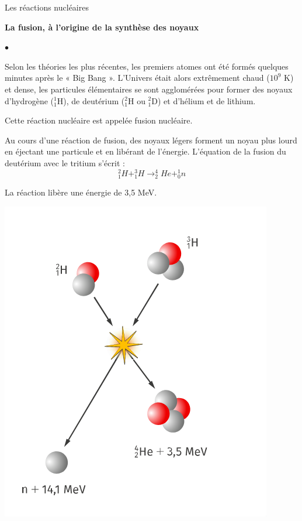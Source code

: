 \documentclass[24pt]{article}
\begin{document}
\begin{concept}{Les réactions nucléaires}
    \begin{center}
        \textbf{La fusion, à l’origine de la synthèse des noyaux}
    \end{center}

    \begin{list}{$\bullet$}{}
        \item
              Selon les théories les plus récentes, les premiers atomes ont été formés quelques minutes
              après le « Big Bang ». L’Univers était alors extrêmement chaud ($10^9$ K) et dense,
              les particules élémentaires se sont agglomérées pour former des noyaux d’hydrogène ($^1_1$H), de
              deutérium ($^2_1$H ou $^2_1$D) et d’hélium et de lithium.

              Cette réaction nucléaire est appelée fusion nucléaire.
              \vspace{10pt}
        \item
              \begin{minipage}[c]{0.6\textwidth}
                  Au cours d’une réaction de fusion, des noyaux légers forment un noyau plus lourd en éjectant
                  une particule et en libérant de l’énergie. L’équation de la fusion du deutérium avec le
                  tritium s’écrit : $$^2_1H + ^3_1H \rightarrow ^4_2He + ^1_0n $$

                  La réaction libère une énergie de 3,5 MeV.
              \end{minipage}
              \hspace{0.05\textwidth}
              \begin{minipage}[c]{0.3\textwidth}
                  \begin{center}
                      \includegraphics[width=0.8\columnwidth]{nuclear1.png}
                  \end{center}
              \end{minipage}
    \end{list}


\end{concept}
\end{document}
